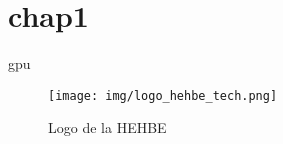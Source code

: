 \newpage
\chapter{chap1}
\label{chap:chap1}
\lipsum[1-2]
\gls{gpu}



\begin{figure}[!ht]
    \centering
    \texttt{[image: img/logo\_hehbe\_tech.png]}
    \caption{Logo de la HEHBE}
    \label{fig:logo heh tech}
\end{figure}
